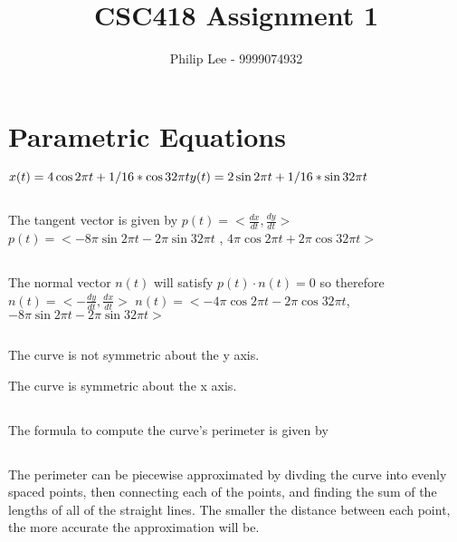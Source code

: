 \documentclass[a4paper,10pt]{scrartcl}
\title{CSC418 Assignment 1}
\author{Philip Lee - 9999074932}
\begin{document}
\maketitle


\section{Parametric Equations}
$x(t) = 4\cos{2\pi t} + 1/16 * \cos{32\pi t} \\ y(t) = 2\sin{2\pi t} + 1/16 * \sin{32\pi t}$

\subsection{}

The tangent vector is given by $p(t) = <\frac{dx}{dt}, \frac{dy}{dt}>$\\
$ p(t) = <-8\pi\sin{2\pi t} - 2\pi\sin{32\pi t}$ , $ 4\pi\cos{2\pi t} + 2\pi\cos{32\pi t}>$

\subsection{}

The normal vector $n(t)$ will satisfy $p(t) \cdot n(t) = 0$ so therefore $n(t) = <- \frac{dy}{dt}, \frac{dx}{dt}>$
$ n(t) =  < - 4\pi\cos{2\pi t} - 2\pi\cos{32\pi t}$, $-8\pi\sin{2\pi t} - 2\pi\sin{32\pi t}>$

\subsection{}

The curve is not symmetric about the y axis.

The curve is symmetric about the x axis.

\subsection{}

The formula to compute the curve's perimeter is given by

\subsection{}

The perimeter can be piecewise approximated by divding the curve into evenly spaced points, then connecting each of the points,
and finding the sum of the lengths of all of the straight lines. The smaller the distance between each point,
the more accurate the approximation will be.\\
\end{document}
